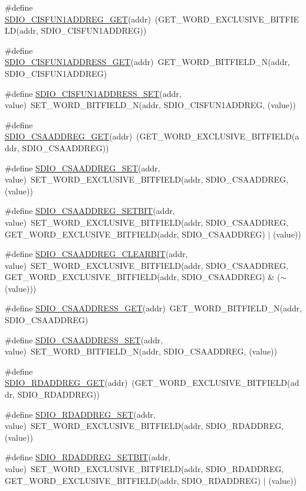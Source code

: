 \begin{DoxyCompactItemize}
\#define \hyperlink{a00570_a4bdc537a2f9f4c71770cbf83f60229b3}{SDIO\_\-CISFUN1ADDREG\_\-GET}(addr)~(GET\_\-WORD\_\-EXCLUSIVE\_\-BITFIELD(addr, SDIO\_\-CISFUN1ADDREG))
\item 
\#define \hyperlink{a00570_ab3b80f7f4bc056bcc12dce5837718c5b}{SDIO\_\-CISFUN1ADDRESS\_\-GET}(addr)~GET\_\-WORD\_\-BITFIELD\_\-N(addr, SDIO\_\-CISFUN1ADDREG)
\item 
\#define \hyperlink{a00570_a93fc4e6e24873336152ed68e0d24588d}{SDIO\_\-CISFUN1ADDRESS\_\-SET}(addr, value)~SET\_\-WORD\_\-BITFIELD\_\-N(addr, SDIO\_\-CISFUN1ADDREG, (value))
\item 
\#define \hyperlink{a00570_a4078cb6ed3a75f40c586b094b1054987}{SDIO\_\-CSAADDREG\_\-GET}(addr)~(GET\_\-WORD\_\-EXCLUSIVE\_\-BITFIELD(addr, SDIO\_\-CSAADDREG))
\item 
\#define \hyperlink{a00570_a4e21f8df2417f965e07536a68d40655b}{SDIO\_\-CSAADDREG\_\-SET}(addr, value)~SET\_\-WORD\_\-EXCLUSIVE\_\-BITFIELD(addr, SDIO\_\-CSAADDREG, (value))
\item 
\#define \hyperlink{a00570_a4c566fe2391ff676e793464f49d5d19f}{SDIO\_\-CSAADDREG\_\-SETBIT}(addr, value)~SET\_\-WORD\_\-EXCLUSIVE\_\-BITFIELD(addr, SDIO\_\-CSAADDREG, GET\_\-WORD\_\-EXCLUSIVE\_\-BITFIELD(addr, SDIO\_\-CSAADDREG) $|$ (value))
\item 
\#define \hyperlink{a00570_adff9f89fbf73cf94f32c4ec75147076b}{SDIO\_\-CSAADDREG\_\-CLEARBIT}(addr, value)~SET\_\-WORD\_\-EXCLUSIVE\_\-BITFIELD(addr, SDIO\_\-CSAADDREG, GET\_\-WORD\_\-EXCLUSIVE\_\-BITFIELD(addr, SDIO\_\-CSAADDREG) \& ($\sim$(value)))
\item 
\#define \hyperlink{a00570_ad4c321fccad1905168326d839d1d1576}{SDIO\_\-CSAADDRESS\_\-GET}(addr)~GET\_\-WORD\_\-BITFIELD\_\-N(addr, SDIO\_\-CSAADDREG)
\item 
\#define \hyperlink{a00570_a2cf6f49b5801398f6cf620eddd8d4286}{SDIO\_\-CSAADDRESS\_\-SET}(addr, value)~SET\_\-WORD\_\-BITFIELD\_\-N(addr, SDIO\_\-CSAADDREG, (value))
\item 
\#define \hyperlink{a00570_a388c04163ca51e2d469fe2d43a61299c}{SDIO\_\-RDADDREG\_\-GET}(addr)~(GET\_\-WORD\_\-EXCLUSIVE\_\-BITFIELD(addr, SDIO\_\-RDADDREG))
\item 
\#define \hyperlink{a00570_adcce97fc9f4e4a32a6dddc8dc92c2072}{SDIO\_\-RDADDREG\_\-SET}(addr, value)~SET\_\-WORD\_\-EXCLUSIVE\_\-BITFIELD(addr, SDIO\_\-RDADDREG, (value))
\item 
\#define \hyperlink{a00570_af7d7da98e096bb917a7e3efe21087df3}{SDIO\_\-RDADDREG\_\-SETBIT}(addr, value)~SET\_\-WORD\_\-EXCLUSIVE\_\-BITFIELD(addr, SDIO\_\-RDADDREG, GET\_\-WORD\_\-EXCLUSIVE\_\-BITFIELD(addr, SDIO\_\-RDADDREG) $|$ (value))

\end{DoxyCompactItemize}
